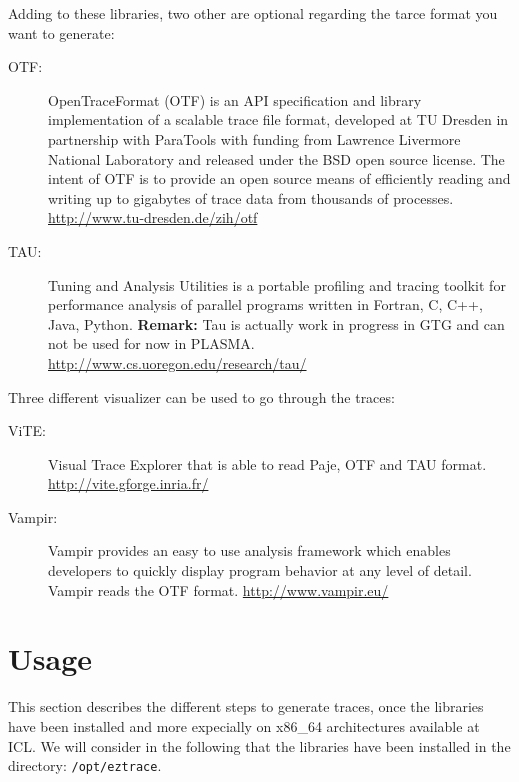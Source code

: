Adding to these libraries, two other are optional regarding the
tarce format you want to generate:
\begin{description}
\item[{\sc OTF}:] OpenTraceFormat (OTF) is an API specification and
  library implementation of a scalable trace file format, developed at
  TU Dresden in partnership with ParaTools with funding from Lawrence
  Livermore National Laboratory and released under the BSD open source
  license. The intent of OTF is to provide an open source means of
  efficiently reading and writing up to gigabytes of trace data from
  thousands of processes.\newline
  \url{http://www.tu-dresden.de/zih/otf}
\item[{\sc TAU}:] Tuning and Analysis Utilities is a portable profiling
  and tracing toolkit for performance analysis of parallel programs
  written in Fortran, C, C++, Java, Python.\newline
  {\bf Remark:} Tau is actually work in progress in GTG and can not be used
  for now in PLASMA.\newline
  \url{http://www.cs.uoregon.edu/research/tau/}
\end{description}

Three different visualizer can be used to go through the traces:
\begin{description}
\item[{\sc ViTE}:] Visual Trace Explorer that is able to read Paje,
  OTF and TAU format.\newline
  \url{http://vite.gforge.inria.fr/}
\item[{\sc Vampir}:] Vampir provides an easy to use analysis framework
  which enables developers to quickly display program behavior at any
  level of detail. Vampir reads the OTF format.\newline 
  \url{http://www.vampir.eu/}
\end{description}

\section{Usage}

This section describes the different steps to generate traces, once
the libraries have been installed and more expecially on x86\_64
architectures available at ICL. We will consider in the following that
the libraries have been installed in the directory: \texttt{/opt/eztrace}.

